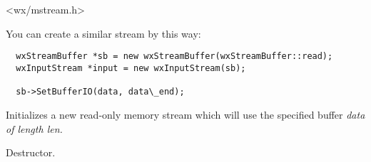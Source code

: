 \section{}\label{wxmeminputstream}




<wx/mstream.h>




You can create a similar stream by this way:

\begin{verbatim}
  wxStreamBuffer *sb = new wxStreamBuffer(wxStreamBuffer::read);
  wxInputStream *input = new wxInputStream(sb);

  sb->SetBufferIO(data, data\_end);
\end{verbatim}




Initializes a new read-only memory stream which will use the specified buffer
\it{data} of length \it{len}.



Destructor.

\section{}\label{wxmemoutputstream}


